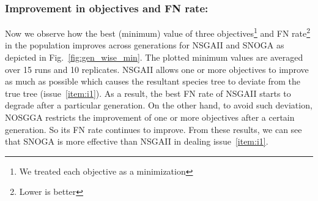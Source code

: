 \subsubsection{Improvement in objectives and FN rate:} Now we observe how the best (minimum) value of three objectives\footnote{We treated each objective as a minimization} and FN rate\footnote{Lower is better} in the population improves across generations for NSGAII and SNOGA as depicted in Fig.~\ref{fig:gen_wise_min}. The plotted minimum values are averaged over 15 runs and 10 replicates. NSGAII allows one or more objectives to improve as much as possible which causes the resultant species tree to deviate from the true tree (issue~\ref{item:i1}). As a result, the best FN rate of NSGAII starts to degrade after a particular generation. On the other hand, to avoid such deviation, NOSGGA restricts the improvement of one or more objectives after a certain generation. So its FN rate continues to improve. From these results, we can see that SNOGA is more effective than NSGAII in dealing issue~\ref{item:i1}.%

